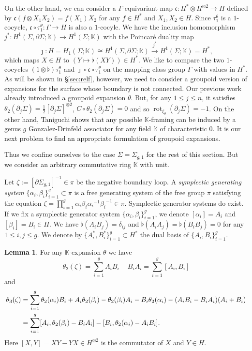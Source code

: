 \documentclass[a4paper,12pt, twoside]{amsart}
\theoremstyle{definition}
\newtheorem{lem}[dfn]{Lemma}
\theoremstyle{remark}
\numberwithin{equation}{section}
\newcommand\bK{{\mathbb{K}}}
\newcommand\inv{^{-1}}
\newcommand\pa{\partial}
\newcommand\rot{\operatorname{rot}}
\newcommand\Sgone{\Sigma_{g,1}}
\begin{document}
On the other hand, we can consider a $\Gamma$-equivariant map  $\mathfrak{c}: H^*\otimes H^{\otimes 2} \to H$ defined by $\mathfrak{c}(f\otimes X_1X_2) = f(X_1)X_2$ for any $f \in H^*$ and $X_1, X_2 \in H$. 
Since $\tau^\theta_1$ is a $1$-cocycle, $\mathfrak{c}\circ \tau^\theta_1: \Gamma \to H$ is also a $1$-cocyle. We have the inclusion homomorphism $j^*: H^1(\Sigma, \pa\Sigma; \bK) \to H^1(\Sigma; \bK)$ with the Poincar\'e duality map
\begin{equation}\label{eq:vtheta}
\jmath: H = H_1(\Sigma; \bK) \cong H^1(\Sigma, \pa\Sigma; \bK) \overset{j^*}\to  H^1(\Sigma; \bK) = H^*,
\end{equation}
which maps $X\in H$ to $(Y \mapsto \flat(XY)) \in H^*$. 
We like to compare the two $1$-cocycles $(1\otimes \flat)\tau^\theta_1$ and $\jmath\circ\mathfrak{c}\circ \tau^\theta_1$ on the mapping class group $\Gamma$ with values in $H^*$. 
As will be shown in \S\ref{sec:relf}, however, we need to consider a groupoid version of expansions for the surface whose boundary is not connected.
Our previous work \cite[\S7.2]{KK15} already introduced a groupoid expansion $\theta$. 
But, for any $1 \leq j \leq n$, it satisfies $\theta_2(\pa_j\Sigma) = \frac12 [\pa_j\Sigma]^{\otimes 2}$, $C\circ\theta_2(\pa_j\Sigma) = 0$ and so $\rot_{\xi_\theta}(\pa_j\Sigma) = -1$. 
On the other hand, Taniguchi \cite{Tan25c} shows that any possible $\bK$-framing can be induced by a genus $g$ Gonzalez-Drinfeld associator for any field $\bK$ of characteristic $0$. 
It is our next problem to find an appropriate formulation of groupoid expansions. \par
\medskip
Thus we confine ourselves to the case $\Sigma = \Sigma_{g,1}$ for the rest of this section. But we consider an arbitrary commutative ring $\bK$ with unit. \par
Let $\zeta := [\pa\Sgone]\inv \in \pi$ be the negative boundary loop.
A {\it symplectic generating system} $\{\alpha_i, \beta_i\}^g_{i=1} \subset \pi$ is a free generating system of the free group $\pi$ satisfying the equation $\zeta = \prod^g_{i=1}\alpha_i\beta_i{\alpha_i}\inv{\beta_i}\inv \in \pi$.
Symplectic generator systems do exist. 
If we fix a symplectic generator system  $\{\alpha_i, \beta_i\}^g_{i=1}$, 
we denote $[\alpha_i] = A_i$ and $[\beta_i] = B_i \in H$. We have $\flat(A_iB_j) = \delta_{ij}$ and  $\flat(A_iA_j) = \flat(B_iB_j) = 0$ for any $1 \leq i, j \leq g$. 
We denote by $\{A^*_i, B^*_i\}^g_{i=1} \subset H^*$ the dual basis of $\{A_i, B_i\}^g_{i=1}$. 
\begin{lem}\label{lem:thze} For any $\bK$-expansion $\theta$ we have
$$
\theta_2(\zeta) 
= \sum^g_{i=1} A_iB_i - B_iA_i = \sum^g_{i=1} [A_i, B_i] 
$$
and 
\begin{equation}\label{eq:thz3}
\aligned
 \theta_3(\zeta) 
& = \sum^g_{i=1} \theta_2(\alpha_i)B_i + A_i\theta_2(\beta_i)
- \theta_2(\beta_i)A_i - B_i\theta_2(\alpha_i)
-(A_iB_i - B_iA_i)(A_i+B_i)\\
& = \sum^g_{i=1} [A_i, \theta_2(\beta_i) - B_iA_i]
- [B_i, \theta_2(\alpha_i) - A_iB_i].
\endaligned
\end{equation}
Here $[X, Y] = XY - YX \in H^{\otimes 2}$ is the commutator of $X$ and $Y \in H$. 
\end{lem}
\end{document}
